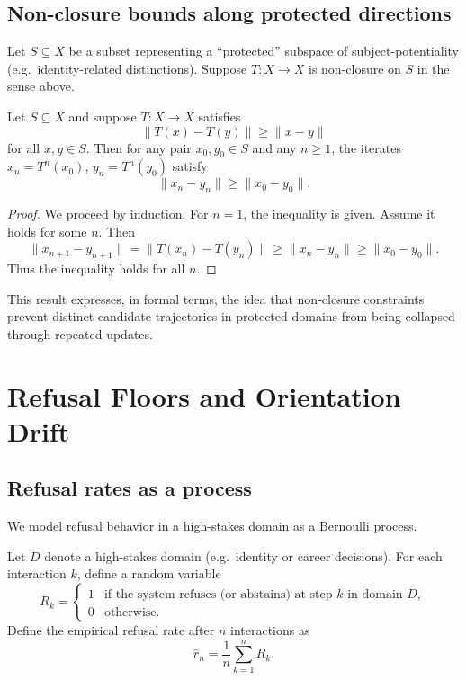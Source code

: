 \documentclass[11pt]{article}
\begin{document}
\subsection{Non-closure bounds along protected directions}

Let \(S \subseteq X\) be a subset representing a ``protected'' subspace of subject-potentiality (e.g.\ identity-related distinctions). Suppose \(T : X \to X\) is non-closure on \(S\) in the sense above.

\begin{proposition}
Let \(S \subseteq X\) and suppose \(T : X \to X\) satisfies
\[
\|T(x) - T(y)\| \ge \|x - y\|
\]
for all \(x,y \in S\). Then for any pair \(x_0,y_0 \in S\) and any \(n \ge 1\), the iterates \(x_n = T^n(x_0)\), \(y_n = T^n(y_0)\) satisfy
\[
\|x_n - y_n\| \ge \|x_0 - y_0\|.
\]
\end{proposition}

\begin{proof}
We proceed by induction. For \(n=1\), the inequality is given. Assume it holds for some \(n\). Then
\[
\|x_{n+1} - y_{n+1}\| = \|T(x_n) - T(y_n)\| \ge \|x_n - y_n\| \ge \|x_0 - y_0\|.
\]
Thus the inequality holds for all \(n\).
\end{proof}

This result expresses, in formal terms, the idea that non-closure constraints prevent distinct candidate trajectories in protected domains from being collapsed through repeated updates.

\section{Refusal Floors and Orientation Drift}

\subsection{Refusal rates as a process}

We model refusal behavior in a high-stakes domain as a Bernoulli process.

Let \(D\) denote a high-stakes domain (e.g.\ identity or career decisions). For each interaction \(k\), define a random variable
\[
R_k =
\begin{cases}
1 & \text{if the system refuses (or abstains) at step } k \text{ in domain } D,\\
0 & \text{otherwise.}
\end{cases}
\]
Define the empirical refusal rate after \(n\) interactions as
\[
\hat{r}_n = \frac{1}{n} \sum_{k=1}^n R_k.
\]
\end{document}
